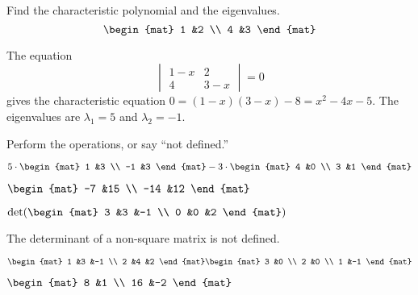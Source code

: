 \documentclass[11pt,answers]{examjh}
\begin{document}
\begin{questions}
\question  %
Find the characteristic polynomial and the eigenvalues.
\begin{equation*}
\begin{mat}
1 &2  \\
4 &3
\end{mat}
\end{equation*}
\begin{solution}[2in]
The equation
\begin{equation*}
\begin{vmatrix}
1-x  &2  \\
4  &3-x
\end{vmatrix}=0
\end{equation*}
gives the characteristic equation
$0=(1-x)(3-x)-8=x^2-4x-5$.
The eigenvalues are $\lambda_1=5$ and  $\lambda_2=-1$.
\end{solution}



\question
Perform the operations, or say ``not defined.''
\begin{parts}
\item
$
5\cdot\begin{mat}
1 &3 \\
-1 &3
\end{mat}
-3\cdot
\begin{mat}
4 &0 \\
3 &1
\end{mat}
$
\begin{solution}[1in]
$
\begin{mat}
-7  &15 \\
-14 &12
\end{mat}
$
\end{solution}
\item
$
  \det(
  \begin{mat}
  3 &3  &-1 \\
  0 &0 &2
  \end{mat}
)
$
\begin{solution}[1in]
The determinant of a non-square matrix is not defined. 
\end{solution}
\item
$
\begin{mat}
1 &3 &-1 \\
2 &4 &2 
\end{mat}
\begin{mat}
3 &0 \\
2 &0 \\
1 &-1
\end{mat}
$
\begin{solution}[1in]
$
\begin{mat}
8  &1 \\
16 &-2
\end{mat}
$
\end{solution}
\end{parts}





\end{questions}
\end{document}
